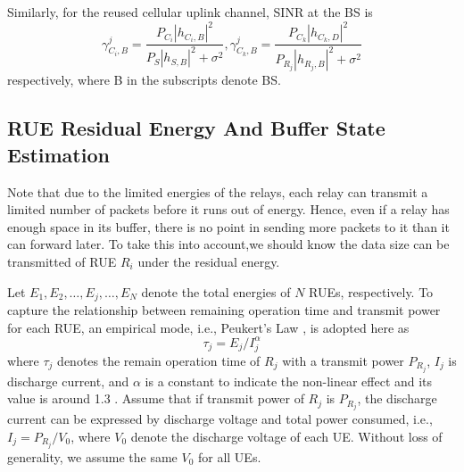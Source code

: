 \documentclass[conference]{IEEEtran}
\begin{document}
Similarly, for the reused cellular uplink channel, SINR at the BS is
\begin{equation}
\gamma^{j}_{C_i,B} = \frac{P_{C_i}|{h_{C_i,B}}|^{2}}{P_S|{h_{S,B}}|^{2} + \sigma^2} ,\gamma^{j}_{C_k,B} = \frac{P_{C_k}|{h_{C_k,D}}|^{2}}{P_{R_j}|{h_{R_j,B}}|^{2} + \sigma^2}
\end{equation}
respectively, where B in the subscripts denote BS.

\subsection{RUE Residual Energy And Buffer State Estimation}
Note that due to the limited energies of the relays, each relay can transmit a limited number of packets before it runs out of energy. Hence, even if a relay has enough space in its buffer, there is no point in sending more packets to it than it can forward later. To take this into account,we should know the data size can be transmitted of RUE $R_i$ under the residual energy.

Let $E_{1},E_{2},\ldots,E_{j},\ldots,E_{N}$ denote the total energies of $N$ RUEs, respectively. To capture the relationship between remaining operation time and transmit power for each RUE, an empirical mode, i.e., Peukert's Law \cite{6981957}, is adopted here as
\begin{equation}
\tau_j = E_j/I^{\alpha}_j
\end{equation}
where $\tau_j$ denotes the remain operation time of $R_j$ with a transmit power $P_{R_j}$, $I_j$ is discharge current, and $\alpha$ is a constant to indicate the non-linear effect and its value is around 1.3 \cite{6981957}. Assume that if transmit power of $R_j$ is $P_{R_j}$, the discharge current can be expressed by discharge voltage and total power consumed, i.e., $I_j = P_{R_j} / V_0$, where $V_0$ denote the discharge voltage of each UE. Without loss of generality, we assume the same $V_0$ for all UEs.
\end{document}

